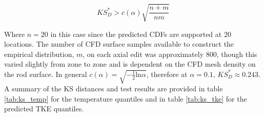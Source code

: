 \begin{equation}
    KS_D^* > c(\alpha) \sqrt{\frac{n+m}{nm}}
\label{eq:ks_crit}
\end{equation}

Where $n=20$ in this case since the predicted CDFs are supported at 20 locations. The number of CFD surface samples available to construct the empirical distribution, $m$, on each axial edit was approximately $800$, though this varied slightly from zone to zone and is dependent on the CFD mesh density on the rod surface.  In general $c(\alpha) = \sqrt{-\frac{1}{2} \mathrm{ln}\alpha}$, therefore at $\alpha=0.1$, $KS_D^* \approx 0.243$.  A summary of the KS distances and test results are provided in table \ref{tab:ks_temp} for the temperature quantiles and in table \ref{tab:ks_tke} for the predicted TKE quantiles.


